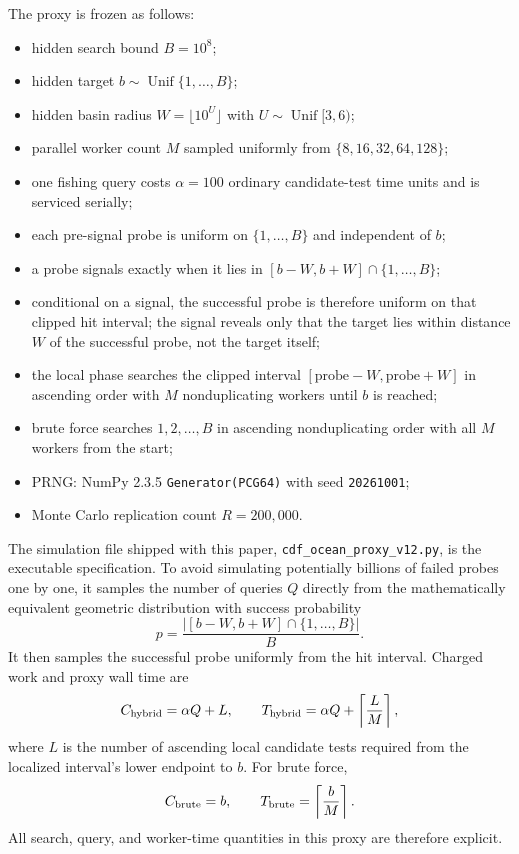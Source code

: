 \documentclass[11pt]{article}
\theoremstyle{definition}
\begin{document}
The proxy is frozen as follows:
\begin{itemize}
\item hidden search bound $B=10^8$;
\item hidden target $b\sim\operatorname{Unif}\{1,\ldots,B\}$;
\item hidden basin radius $W=\lfloor 10^U\rfloor$ with $U\sim\operatorname{Unif}[3,6)$;
\item parallel worker count $M$ sampled uniformly from $\{8,16,32,64,128\}$;
\item one fishing query costs $\alpha=100$ ordinary candidate-test time units and is serviced serially;
\item each pre-signal probe is uniform on $\{1,\ldots,B\}$ and independent of $b$;
\item a probe signals exactly when it lies in $[b-W,b+W]\cap\{1,\ldots,B\}$;
\item conditional on a signal, the successful probe is therefore uniform on that clipped hit interval; the signal reveals only that the target lies within distance $W$ of the successful probe, not the target itself;
\item the local phase searches the clipped interval $[\text{probe}-W,\text{probe}+W]$ in ascending order with $M$ nonduplicating workers until $b$ is reached;
\item brute force searches $1,2,\ldots,B$ in ascending nonduplicating order with all $M$ workers from the start;
\item PRNG: NumPy 2.3.5 \texttt{Generator(PCG64)} with seed \texttt{20261001};
\item Monte Carlo replication count $R=200{,}000$.
\end{itemize}

The simulation file shipped with this paper, \texttt{cdf\_ocean\_proxy\_v12.py}, is the executable specification. To avoid simulating potentially billions of failed probes one by one, it samples the number of queries $Q$ directly from the mathematically equivalent geometric distribution with success probability
\[
p=\frac{|[b-W,b+W]\cap\{1,\ldots,B\}|}{B}.
\]
It then samples the successful probe uniformly from the hit interval. Charged work and proxy wall time are
\[
C_{\rm hybrid}=\alpha Q+L,
\qquad
T_{\rm hybrid}=\alpha Q+\left\lceil\frac{L}{M}\right\rceil,
\]
where $L$ is the number of ascending local candidate tests required from the localized interval's lower endpoint to $b$. For brute force,
\[
C_{\rm brute}=b,
\qquad
T_{\rm brute}=\left\lceil\frac{b}{M}\right\rceil.
\]
All search, query, and worker-time quantities in this proxy are therefore explicit.
\end{document}
